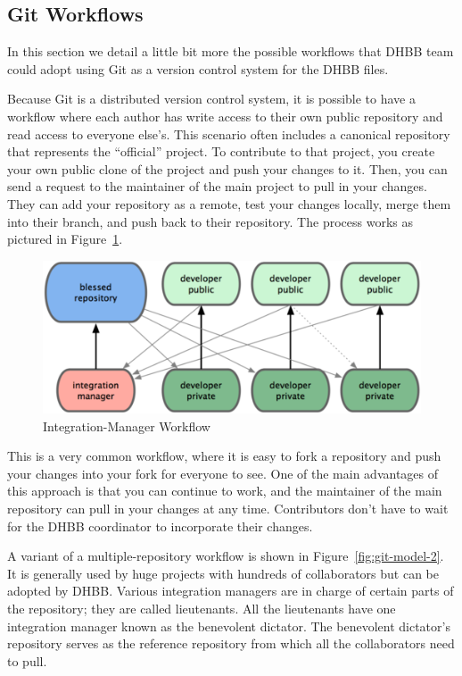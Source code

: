 \documentclass{llncs}
\begin{document}
\subsection{Git Workflows}

In this section we detail a little bit more the possible workflows
that DHBB team could adopt using Git as a version control system for
the DHBB files.

Because Git is a distributed version control system, it is possible to
have a workflow where each author has write access to their own public
repository and read access to everyone else's. This scenario often
includes a canonical repository that represents the ``official''
project. To contribute to that project, you create your own public
clone of the project and push your changes to it. Then, you can send a
request to the maintainer of the main project to pull in your
changes. They can add your repository as a remote, test your changes
locally, merge them into their branch, and push back to their
repository. The process works as pictured in
Figure~\ref{fig:git-model-1}.

\begin{figure}[thbp]
  \centering
  \includegraphics[width=.8\textwidth]{git-model-1.png}
  \caption{Integration-Manager Workflow}\label{fig:git-model-1}
\end{figure}

This is a very common workflow, where it is easy to fork a repository
and push your changes into your fork for everyone to see. One of the
main advantages of this approach is that you can continue to work, and
the maintainer of the main repository can pull in your changes at any
time. Contributors don't have to wait for the DHBB coordinator to
incorporate their changes.

A variant of a multiple-repository workflow is shown in
Figure~\ref{fig:git-model-2}. It is generally used by huge projects
with hundreds of collaborators but can be adopted by DHBB. Various
integration managers are in charge of certain parts of the repository;
they are called lieutenants. All the lieutenants have one integration
manager known as the benevolent dictator. The benevolent dictator's
repository serves as the reference repository from which all the
collaborators need to pull. 
\end{document}
